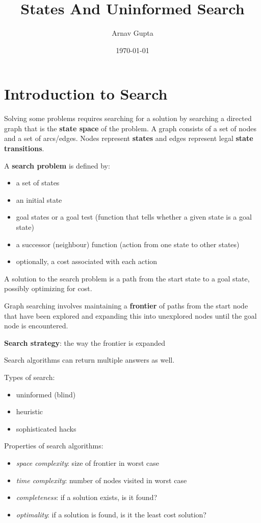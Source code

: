 \documentclass[11pt]{article}
\author{Arnav Gupta}
\date{\today}
\title{States And Uninformed Search}
\begin{document}
\maketitle
\tableofcontents

\section{Introduction to Search}
\label{sec:org0668178}
Solving some problems requires searching for a solution by searching a directed graph that is
the \textbf{state space} of the problem.
A graph consists of a set of nodes and a set of arcs/edges.
Nodes represent \textbf{states} and edges represent legal \textbf{state transitions}.

A \textbf{search problem} is defined by:
\begin{itemize}
\item a set of states
\item an initial state
\item goal states or a goal test (function that tells whether a given state is a goal state)
\item a successor (neighbour) function (action from one state to other states)
\item optionally, a cost associated with each action
\end{itemize}

A solution to the search problem is a path from the start state to a goal state, possibly
optimizing for cost.

Graph searching involves maintaining a \textbf{frontier} of paths from the start node that have been explored
and expanding this into unexplored nodes until the goal node is encountered.

\textbf{Search strategy}: the way the frontier is expanded

Search algorithms can return multiple answers as well.

Types of search:
\begin{itemize}
\item uninformed (blind)
\item heuristic
\item sophisticated hacks
\end{itemize}

Properties of search algorithms:
\begin{itemize}
\item \emph{space complexity}: size of frontier in worst case
\item \emph{time complexity}: number of nodes visited in worst case
\item \emph{completeness}: if a solution exists, is it found?
\item \emph{optimality}: if a solution is found, is it the least cost solution?
\end{itemize}
\end{document}
